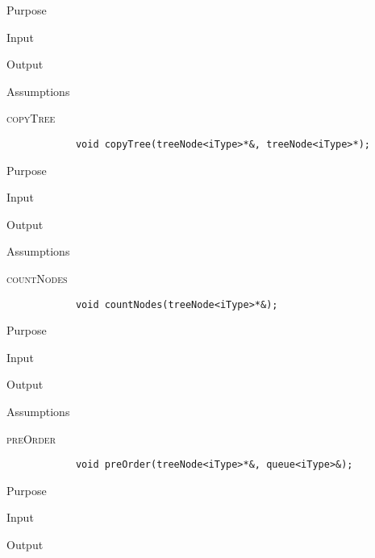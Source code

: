 \documentclass[pdftex, 12pt]{article}
\begin{document}
\begin{description}
\begin{description}
			\item{Purpose}

			\item{Input}

			\item{Output}

			\item{Assumptions}

		\end{description}
	\item{\textsc{copyTree}}
		\begin{lstlisting}
			void copyTree(treeNode<iType>*&, treeNode<iType>*);
		\end{lstlisting}
		\begin{description}

			\item{Purpose}

			\item{Input}

			\item{Output}

			\item{Assumptions}

		\end{description}
	\item{\textsc{countNodes}}
		\begin{lstlisting}
			void countNodes(treeNode<iType>*&);
		\end{lstlisting}
		\begin{description}

			\item{Purpose}

			\item{Input}

			\item{Output}

			\item{Assumptions}

		\end{description}
	\item{\textsc{preOrder}}
		\begin{lstlisting}
			void preOrder(treeNode<iType>*&, queue<iType>&);
		\end{lstlisting}
		\begin{description}

			\item{Purpose}

			\item{Input}

			\item{Output}


\end{description}
\end{description}
\end{document}
